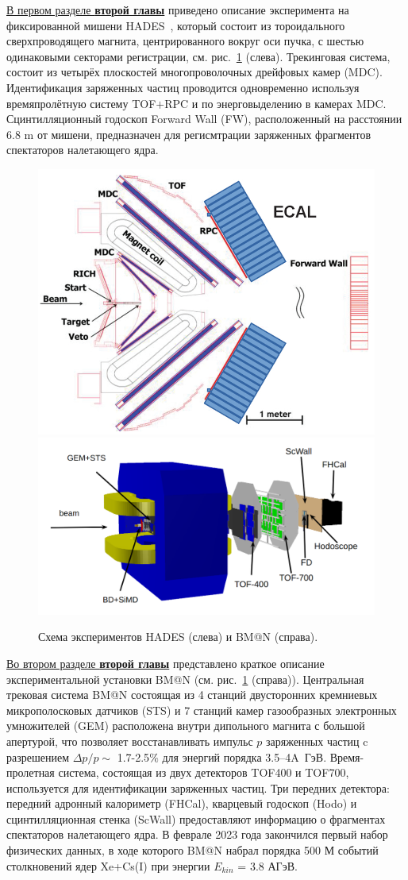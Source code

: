 \underline{В первом разделе \textbf{второй главы}} приведено описание эксперимента на фиксированной мишени  HADES~\cite{HADES:2009aat}, который 
состоит из тороидального сверхпроводящего магнита, центрированного вокруг оси пучка, с шестью одинаковыми секторами регистрации, см. рис.~\ref{fig:hades_bmn_layouts} (слева).
Трекинговая система, состоит из четырёх плоскостей многопроволочных дрейфовых камер (MDC).
Идентификация заряженных частиц проводится одновременно  используя  времяпролётную систему TOF$+$RPC и по энерговыделению в камерах MDC.
Сцинтилляционный годоскоп Forward Wall (FW), расположенный на расстоянии 6.8 m от мишени, предназначен для регисмтрации заряженных фрагментов спектаторов налетающего ядра.
%
\begin{figure}[h]
\begin{center}
\includegraphics[width=0.37\linewidth]{images/hades_layout.jpg}
\includegraphics[width=0.55\linewidth]{images/BM@N_layout.png}
\caption{Схема экспериментов HADES (слева) и BM@N (справа).}
\label{fig:hades_bmn_layouts}
\end{center}
\end{figure}

\underline{Во втором разделе \textbf{второй главы}} представлено краткое описание экспериментальной установки BM@N (см. рис.~\ref{fig:hades_bmn_layouts} (справа)).
Центральная трековая система BM@N состоящая из 4 станций двусторонних кремниевых микрополосковых датчиков (STS) и 7 станций камер газообразных электронных умножителей (GEM) расположена внутри дипольного магнита с большой апертурой, что позволяет восстанавливать импульс $p$ заряженных частиц c разрешением  $\Delta p/p \sim$ 1.7-2.5$\%$ для энергий порядка 3.5--4A~ГэВ. 
Время-пролетная система, состоящая из двух детекторов TOF400 и TOF700, используется для идентификации заряженных частиц.
Три передних детектора: передний адронный калориметр (FHCal), кварцевый годоскоп (Hodo) и  сцинтилляционная стенка (ScWall) предоставляют информацию о фрагментах спектаторов налетающего ядра.
В феврале 2023 года закончился первый  набор физических данных, в ходе которого BM@N набрал порядка 500 М событий столкновений ядер Xe+Cs(I) при энергии  $E_{kin}$ = 3.8 АГэВ.


